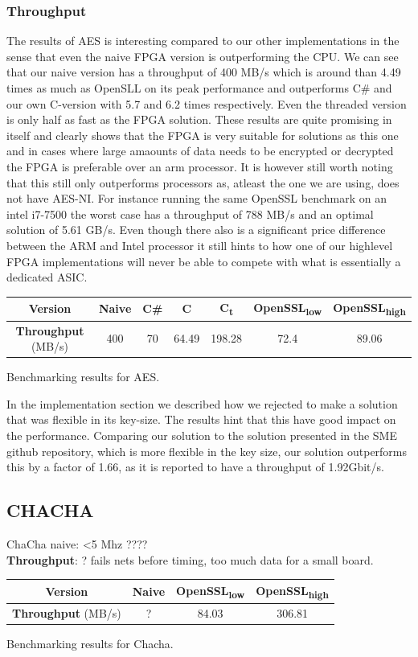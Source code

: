 \documentclass[a4paper]{article}
\begin{document}
\subsubsection{Throughput}
\label{sec:orgf70b1dd}
The results of AES is interesting compared to our other implementations in the sense that even the naive FPGA version is outperforming the CPU. We can see that our naive version has a throughput of 400 MB/s which is around than 4.49 times as much as OpenSLL on its peak performance and outperforms C\# and our own C-version with 5.7 and 6.2 times respectively. Even the threaded version is only half as fast as the FPGA solution. These results are quite promising in itself and clearly shows that the FPGA is very suitable for solutions as this one and in cases where large amaounts of data needs to be encrypted or decrypted the FPGA is preferable over an arm processor. It is however still worth noting that this still only outperforms processors as, atleast the one we are using, does not have AES-NI. For instance running the same OpenSSL benchmark on an intel i7-7500 the worst case has a throughput of 788 MB/s and an optimal solution of 5.61 GB/s. Even though there also is a significant price difference between the ARM and Intel processor it still hints to how one of our highlevel FPGA implementations will never be able to compete with what is essentially a dedicated ASIC.
\begin{table}[htbp]
\centering
\begin{tabular}{|c|c|c|c|c|c|c|}
\hline
\textbf{Version} & Naive & C\# & C & C\textsubscript{t} & OpenSSL\textsubscript{low} & OpenSSL\textsubscript{high}\\
\hline
\textbf{Throughput} (MB/s) & 400 & 70 & 64.49 & 198.28 & 72.4 & 89.06\\
\hline
\end{tabular}
Benchmarking results for AES.

\end{table}
In the implementation section we described how we rejected to make a solution that was flexible in its key-size. The results hint that this have good impact on the performance. Comparing our solution to the solution presented in the SME github repository, which is more flexible in the key size, our solution outperforms this by a factor of 1.66, as it is reported to have a throughput of 1.92Gbit/s.


\subsection{CHACHA}
\label{sec:orgbec5d2e}
ChaCha naive: <5 Mhz ????\\
\textbf{Throughput}: ?
fails nets before timing, too much data for a small board.
\begin{table}[htbp]
\centering
\begin{tabular}{|c|c|c|c|}
\hline
\textbf{Version} & Naive & OpenSSL\textsubscript{low} & OpenSSL\textsubscript{high}\\
\hline
\textbf{Throughput} (MB/s) & ? & 84.03 & 306.81\\
\hline
\end{tabular}
Benchmarking results for Chacha.

\end{table}
\end{document}
